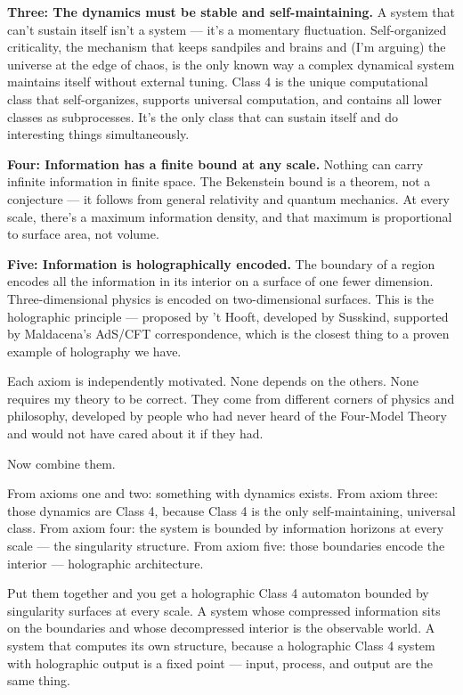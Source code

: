\documentclass[11pt, twoside, openright]{book}
\begin{document}
\textbf{Three: The dynamics must be stable and self-maintaining.} A system that can't sustain itself isn't a system --- it's a momentary fluctuation. Self-organized criticality, the mechanism that keeps sandpiles and brains and (I'm arguing) the universe at the edge of chaos, is the only known way a complex dynamical system maintains itself without external tuning. Class 4 is the unique computational class that self-organizes, supports universal computation, and contains all lower classes as subprocesses. It's the only class that can sustain itself and do interesting things simultaneously.

\textbf{Four: Information has a finite bound at any scale.} Nothing can carry infinite information in finite space. The Bekenstein bound is a theorem, not a conjecture --- it follows from general relativity and quantum mechanics. At every scale, there's a maximum information density, and that maximum is proportional to surface area, not volume.

\textbf{Five: Information is holographically encoded.} The boundary of a region encodes all the information in its interior on a surface of one fewer dimension. Three-dimensional physics is encoded on two-dimensional surfaces. This is the holographic principle --- proposed by 't Hooft, developed by Susskind, supported by Maldacena's AdS/CFT correspondence, which is the closest thing to a proven example of holography we have.

Each axiom is independently motivated. None depends on the others. None requires my theory to be correct. They come from different corners of physics and philosophy, developed by people who had never heard of the Four-Model Theory and would not have cared about it if they had.

Now combine them.

From axioms one and two: something with dynamics exists. From axiom three: those dynamics are Class 4, because Class 4 is the only self-maintaining, universal class. From axiom four: the system is bounded by information horizons at every scale --- the singularity structure. From axiom five: those boundaries encode the interior --- holographic architecture.

Put them together and you get a holographic Class 4 automaton bounded by singularity surfaces at every scale. A system whose compressed information sits on the boundaries and whose decompressed interior is the observable world. A system that computes its own structure, because a holographic Class 4 system with holographic output is a fixed point --- input, process, and output are the same thing.
\end{document}

